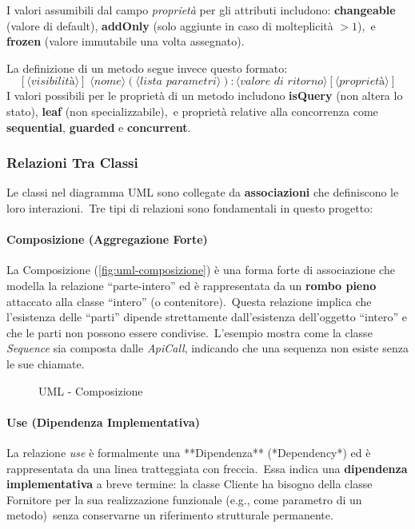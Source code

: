 I valori assumibili dal campo \textit{proprietà} per gli attributi includono: \textbf{changeable} (valore di default), \textbf{addOnly} (solo aggiunte in caso di molteplicità $>1$),\
e \textbf{frozen} (valore immutabile una volta assegnato).

La definizione di un metodo segue invece questo formato:
\[
    [\langle \textit{visibilità} \rangle] \;
    \langle \textit{nome} \rangle
    (\langle \textit{lista parametri} \rangle)
    : \langle \textit{valore di ritorno} \rangle
    [\langle \textit{proprietà} \rangle]
\]
I valori possibili per le proprietà di un metodo includono \textbf{isQuery} (non altera lo stato), \textbf{leaf} (non specializzabile),\
e proprietà relative alla concorrenza come \textbf{sequential}, \textbf{guarded} e \textbf{concurrent}.

\subsubsection{Relazioni Tra Classi}

Le classi nel diagramma UML sono collegate da \textbf{associazioni} che definiscono le loro interazioni.\
Tre tipi di relazioni sono fondamentali in questo progetto:

\paragraph{Composizione (Aggregazione Forte)}
La Composizione (\autoref{fig:uml-composizione}) è una forma forte di associazione che modella la relazione ``parte-intero'' ed è rappresentata da un \textbf{rombo pieno}\\
attaccato alla classe ``intero'' (o contenitore).\
Questa relazione implica che l'esistenza delle ``parti'' dipende strettamente dall'esistenza dell'oggetto ``intero'' e che le parti non possono essere condivise.\
L'esempio mostra come la classe \textit{Sequence} sia composta dalle \textit{ApiCall}, indicando che una sequenza non esiste senza le sue chiamate.

\begin{figure}[h!]
    \centering
    \caption{UML - Composizione}
    \label{fig:uml-composizione}
\end{figure}

\paragraph{Use (Dipendenza Implementativa)}
La relazione \textit{use} è formalmente una **Dipendenza** (*Dependency*) ed è rappresentata da una linea tratteggiata con freccia.\
Essa indica una \textbf{dipendenza implementativa} a breve termine: la classe Cliente ha bisogno della classe Fornitore per la sua realizzazione funzionale (e.g., come parametro di un metodo)\
senza conservarne un riferimento strutturale permanente.

